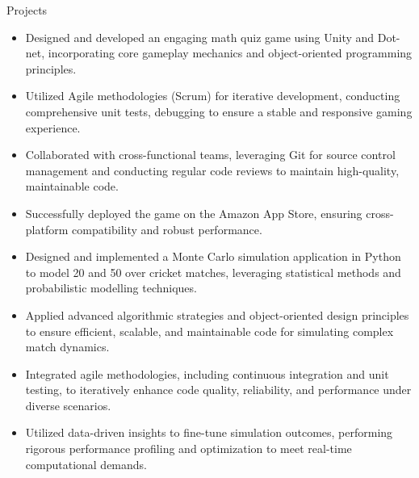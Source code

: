 \documentclass{resume}
\begin{document}
\begin{experienceSection}{Projects}
    \projectItem[
        title={Unity-Based Math Quiz Game for Kids},
        duration={Jan 2024 – May 2024}
    ]
    \begin{itemize}
        \vspace{-0.5em}
        \itemsep -6pt {}
        \item Designed and developed an engaging math quiz game using Unity and Dot-net, incorporating core gameplay mechanics and object-oriented programming principles.
        \item Utilized Agile methodologies (Scrum) for iterative development, conducting comprehensive unit tests, debugging to ensure a stable and responsive gaming experience.
        \item Collaborated with cross-functional teams, leveraging Git for source control management and conducting regular code reviews to maintain high-quality, maintainable code.
        \item Successfully deployed the game on the Amazon App Store, ensuring cross-platform compatibility and robust performance.
    \end{itemize}

    \projectItem[
        title=Text-based Cricket Game Simulation,
        duration=Jun 2023 - Aug 2024
    ]
    \begin{itemize}
        \vspace{-0.5em}
        \itemsep -6pt {}
        \item Designed and implemented a Monte Carlo simulation application in Python to model 20 and 50 over cricket matches, leveraging statistical methods and probabilistic modelling techniques.
        \item Applied advanced algorithmic strategies and object-oriented design principles to ensure efficient, scalable, and maintainable code for simulating complex match dynamics.
        \item Integrated agile methodologies, including continuous integration and unit testing, to iteratively enhance code quality, reliability, and performance under diverse scenarios.
        \item Utilized data-driven insights to fine-tune simulation outcomes, performing rigorous performance profiling and optimization to meet real-time computational demands.
    \end{itemize}
\end{experienceSection}
\end{document}
